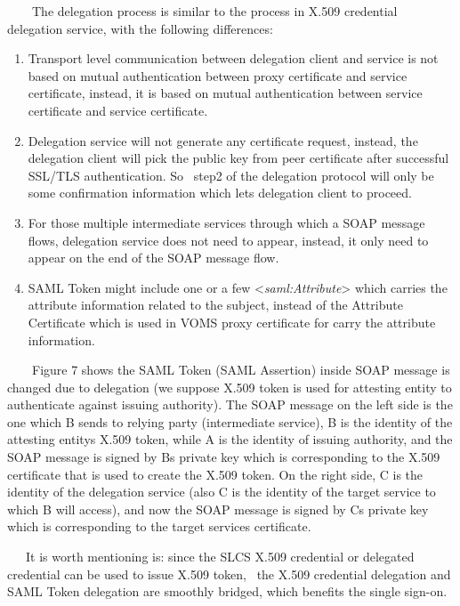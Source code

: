 \documentclass{article}
\newcommand\liststyleLvi{%
\renewcommand\theenumi{\arabic{enumi}}
\renewcommand\theenumii{\arabic{enumii}}
\renewcommand\theenumiii{\arabic{enumiii}}
\renewcommand\theenumiv{\arabic{enumiv}}
\renewcommand\labelenumi{\theenumi.}
\renewcommand\labelenumii{\theenumii.}
\renewcommand\labelenumiii{\theenumiii.}
\renewcommand\labelenumiv{\theenumiv.}
}
\begin{document}
\ \ \ \ The delegation process is similar to the process in X.509
credential delegation service, with the following differences:

\liststyleLvi
\begin{enumerate}
\item Transport level communication between delegation client and
service is not based on mutual authentication between proxy certificate
and service certificate, instead, it is based on mutual authentication
between service certificate and service certificate.
\item Delegation service will not generate any certificate request,
instead, the delegation client will pick the public key from peer
certificate after successful SSL/TLS authentication. So \ step2 of the
delegation protocol will only be some confirmation information which
lets delegation client to proceed. 
\item For those multiple intermediate services through which a SOAP
message flows, delegation service does not need to appear, instead, it
only need to appear on the end of the SOAP message flow.
\item SAML Token might include one or a few
{\textless}\textit{saml:Attribute}{\textgreater} which carries the
attribute information related to the subject, instead of the Attribute
Certificate which is used in VOMS proxy certificate for carry the
attribute information.
\end{enumerate}
\ \ \ \ Figure 7 shows the SAML Token (SAML Assertion) inside SOAP
message is changed due to delegation (we suppose X.509 token is used
for attesting entity to authenticate against issuing authority). The
SOAP message on the left side is the one which B sends to relying party
(intermediate service), B is the identity of the attesting
entity{\textquotesingle}s X.509 token, while A is the identity of
issuing authority, and the SOAP message is signed by
B{\textquotesingle}s private key which is corresponding to the X.509
certificate that is used to create the X.509 token. On the right side,
C is the identity of the delegation service (also C is the identity of
the target service to which B will access), and now the SOAP message is
signed by C{\textquotesingle}s private key which is corresponding to
the target service{\textquotesingle}s certificate.

\ \ \ It is worth mentioning is: since the SLCS X.509 credential or
delegated credential can be used to issue X.509 token, \ the X.509
credential delegation and SAML Token delegation are smoothly bridged,
which benefits the single sign-on. 
\end{document}
